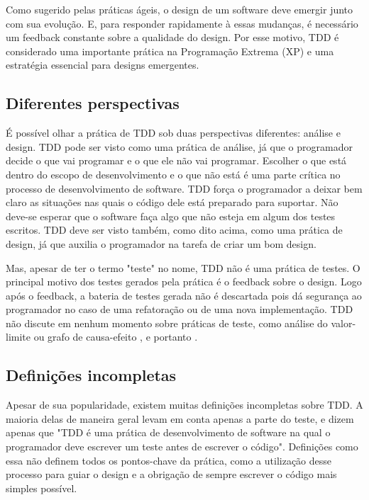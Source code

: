 Como sugerido pelas práticas ágeis,
o design de um software deve emergir junto com sua evolução. E, para responder rapidamente à essas mudanças, é necessário
um feedback constante sobre a qualidade do design. Por esse motivo, TDD é considerado uma importante prática na Programação 
Extrema (XP) \cite{XPExplained} e uma estratégia essencial para designs emergentes.

\subsection{Diferentes perspectivas}

É possível olhar a prática de TDD sob duas perspectivas diferentes: análise e design. 
TDD pode ser visto como uma prática de análise, já que o programador decide o que vai programar e o que ele não vai programar. Escolher o que
está dentro do escopo de desenvolvimento e o que não está é uma parte crítica no processo de desenvolvimento de software. TDD força
o programador a deixar bem claro as situações nas quais o código dele está preparado para suportar. Não deve-se esperar que
o software faça algo que não esteja em algum dos testes escritos.
TDD deve ser visto também, como dito acima, como uma prática de design, já que auxilia o programador na tarefa de criar um bom
design. 

Mas, apesar de ter o termo "teste" no nome, TDD não é uma prática de testes. O principal motivo dos testes gerados pela prática é o
feedback sobre o design. Logo após o feedback, a bateria de testes gerada não é descartada pois dá segurança ao programador no caso de uma refatoração
ou de uma nova implementação. TDD não discute em nenhum momento sobre práticas de teste, como análise do valor-limite ou
grafo de causa-efeito \cite{art-of-sw-testing}, e portanto .

\subsection{Definições incompletas} 
\label{sec:tdd-definicoes-incompletas}

Apesar de sua popularidade, existem muitas definições incompletas sobre TDD. A maioria delas de maneira geral levam em conta
apenas a parte do teste, e dizem apenas
que "TDD é uma prática de desenvolvimento de software na qual o programador deve escrever um teste antes de escrever o código".
Definições como essa não definem todos os pontos-chave da prática, como a utilização desse processo para guiar o design e
a obrigação de sempre escrever o código mais simples possível.

